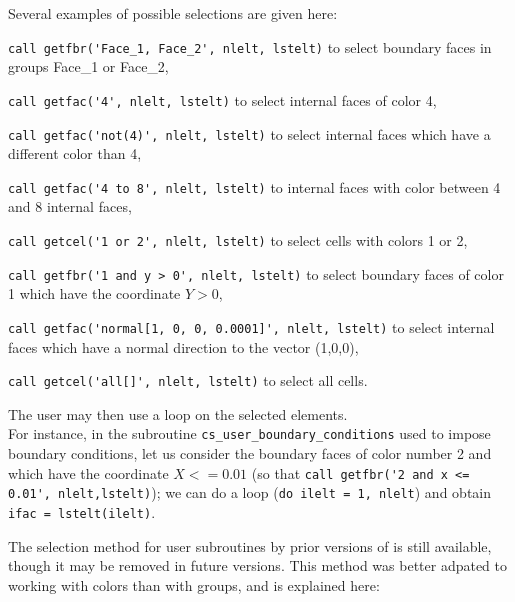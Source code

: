 {{{Several examples of possible selections are given here:
\begin{list}{-}{}
\item \verb+call getfbr('Face_1, Face_2', nlelt, lstelt)+ to select
  boundary faces in groups Face\_1 or Face\_2,  
\item \verb+call getfac('4', nlelt, lstelt)+ to select internal
  faces of color 4,
\item \verb+call getfac('not(4)', nlelt, lstelt)+ to select internal
  faces which have a different color than 4,
\item \verb+call getfac('4 to 8', nlelt, lstelt)+ to internal faces
with color between 4 and 8 internal faces,
\item \verb+call getcel('1 or 2', nlelt, lstelt)+ to select cells
  with colors 1 or 2,
\item \verb+call getfbr('1 and y > 0', nlelt, lstelt)+ to select boundary
  faces of color 1 which have the coordinate $Y > 0$,
\item \verb+call getfac('normal[1, 0, 0, 0.0001]', nlelt, lstelt)+ to select
internal faces which have a normal direction to the vector (1,0,0),  
\item \verb+call getcel('all[]', nlelt, lstelt)+ to select all cells.
\end{list}

The user may then use a loop on the selected elements.\\
For instance, in the subroutine \texttt{cs\_user\_boundary\_conditions} used to impose
boundary  conditions, let us consider the boundary faces of color
number 2 and which have the coordinate $X <= 0.01$
(so that \verb+call getfbr('2 and x <= 0.01', nlelt,lstelt)+);
we can do a loop (\verb+do ilelt = 1, nlelt+) and
obtain \verb+ifac = lstelt(ilelt)+.


The selection method for user subroutines by prior versions of \CS
is still available, though it may be removed in future versions.
This method was better adpated to working with colors than with groups,
and is explained here:

}}}
